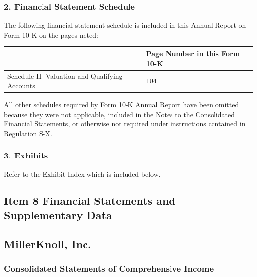\subsubsection{2. Financial Statement Schedule}

The following financial statement schedule is included in this Annual Report on Form 10-K on the pages noted:

\begin{table}[h]
    \centering
    \begin{tabular}{|l|l|}
        \hline
        & \textbf{Page Number in this Form 10-K} \\ \hline
        Schedule II- Valuation and Qualifying Accounts & 104 \\ \hline
    \end{tabular}
\end{table}

All other schedules required by Form 10-K Annual Report have been omitted because they were not applicable, included in the Notes to the Consolidated Financial Statements, or otherwise not required under instructions contained in Regulation S-X.

\subsubsection{3. Exhibits}

Refer to the Exhibit Index which is included below.

\subsection{Item 8 Financial Statements and Supplementary Data}
\subsection{MillerKnoll, Inc.}
\subsubsection{Consolidated Statements of Comprehensive Income}

